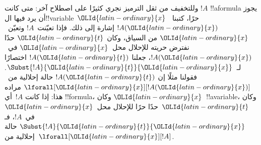 \documentclass[../../../include/open-logic-section]{subfiles}
\begin{document}
وللتخفيف من ثقل الترميز نجري كثيرًا على اصطلاح آخر: متى كانت
$!A$ !!a{formula} يجوز أن يرد فيها ال!!{variable}~$\OLId{latin-ordinary}{x}$ حرًا،
كتبنا~$!A(\OLId{latin-ordinary}{x})$ إشارة إلى ذلك. فإذا تعيّنت~$!A$ وتعيّن~$\OLId{latin-ordinary}{x}$ من السياق،
وكان $\OLId{latin-ordinary}{t}$ حدًا نفترض حريته للإحلال محل~$\OLId{latin-ordinary}{x}$ في~$!A(\OLId{latin-ordinary}{x})$، جعلنا
$!A(\OLId{latin-ordinary}{t})$ اختصارًا لـ~$\Subst{!A}{\OLId{latin-ordinary}{t}}{\OLId{latin-ordinary}{x}}$. فقولنا مثلًا إن
$!A(\OLId{latin-ordinary}{t})$ حالة إحلالية من~$\lforall[\OLId{latin-ordinary}{x}][!A(\OLId{latin-ordinary}{x})]$ مراده هذا:
إذا كانت $!A$~أي !!{formula}، وكان $\OLId{latin-ordinary}{x}$~!!a{variable}، وكان $\OLId{latin-ordinary}{t}$~حدًا
حرًا للإحلال محل~$\OLId{latin-ordinary}{x}$ في~$!A$، فـ$\Subst{!A}{\OLId{latin-ordinary}{t}}{\OLId{latin-ordinary}{x}}$ حالة إحلالية
من~$\lforall[\OLId{latin-ordinary}{x}][!A]$.
\end{document}

